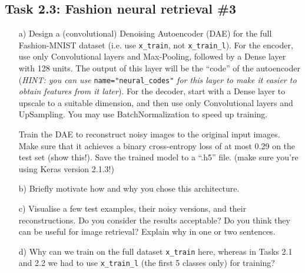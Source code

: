 \documentclass[a4paper,twoside,10pt]{article}
\begin{document}
\subsection*{Task 2.3: Fashion neural retrieval \#3}
\begin{itemize}
  \item[a)] Design a (convolutional) Denoising Autoencoder (DAE) for the full Fashion-MNIST dataset (i.e. use \texttt{x\_train}, not \texttt{x\_train\_l}). For the encoder, use only Convolutional layers and Max-Pooling, followed by a Dense layer with 128 units. The output of this layer will be the ``code'' of the autoencoder (\emph{HINT: you can use} \texttt{name="neural\_codes"} \emph{for this layer to make it easier to obtain features from it later}). For the decoder, start with a Dense layer to upscale to a suitable dimension, and then use only Convolutional layers and UpSampling. You may use BatchNormalization to speed up training.

Train the DAE to reconstruct noisy images to the original input images. Make sure that it achieves a binary cross-entropy loss of at most 0.29 on the test set (show this!). Save the trained model to a ``.h5'' file. (make sure you're using Keras version 2.1.3!)
  \item[b)] Briefly motivate how and why you chose this architecture.
  \item[c)] Visualise a few test examples, their noisy versions, and their reconstructions. Do you consider the results acceptable? Do you think they can be useful for image retrieval? Explain why in one or two sentences.
  \item[d)] Why can we train on the full dataset \texttt{x\_train} here, whereas in Tasks 2.1 and 2.2 we had to use \texttt{x\_train\_l} (the first 5 classes only) for training?
\end{itemize}
\end{document}
